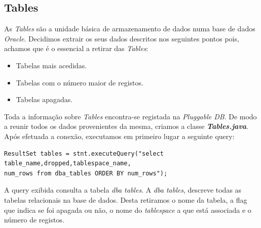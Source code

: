 \subsection*{Tables}
As \textit{Tables} são a unidade básica de armazenamento de dados numa base de dados \textit{Oracle}. Decidimos extrair os seus  dados descritos nos seguintes pontos pois, achamos que é o essencial a retirar das \textit{Tables}:
\begin{itemize}
    \item Tabelas mais acedidas.
    \item Tabelas com o número maior de registos.
    \item Tabelas apagadas.
\end{itemize}
Toda a informação sobre \textit{Tables} encontra-se registada na \textit{Pluggable DB}. De modo a reunir todos os dados provenientes da mesma, criamos a classe \textbf{\textit{Tables.java}}. Após efetuada a conexão, executamos em primeiro lugar a seguinte query:
\vspace{2mm}
\begin{lstlisting}
ResultSet tables = stnt.executeQuery("select table_name,dropped,tablespace_name,
num_rows from dba_tables ORDER BY num_rows");
\end{lstlisting}
\vspace{2mm}
A query exibida consulta a tabela \textit{dba tables}. A \textit{dba tables}, descreve todas as tabelas relacionais na base de dados. Desta retiramos o nome da tabela, a flag que indica se foi apagada ou não, o nome do \textit{tablespace} a que está associada e o número de registos.

